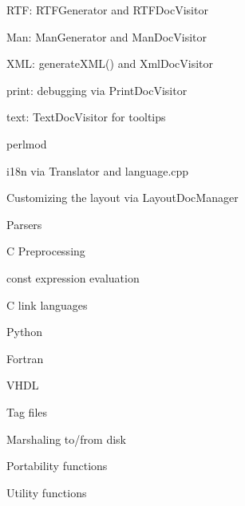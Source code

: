 \begin{DoxyItemize}
\begin{DoxyItemize}
\item R\-T\-F\-: R\-T\-F\-Generator and R\-T\-F\-Doc\-Visitor
\item Man\-: Man\-Generator and Man\-Doc\-Visitor
\item X\-M\-L\-: generate\-X\-M\-L() and Xml\-Doc\-Visitor
\item print\-: debugging via Print\-Doc\-Visitor
\item text\-: Text\-Doc\-Visitor for tooltips
\item perlmod
\end{DoxyItemize}
\item i18n via Translator and language.\-cpp
\item Customizing the layout via Layout\-Doc\-Manager
\item Parsers
\begin{DoxyItemize}
\item C Preprocessing
\begin{DoxyItemize}
\item const expression evaluation
\end{DoxyItemize}
\item C link languages
\item Python
\item Fortran
\item V\-H\-D\-L
\item Tag files
\end{DoxyItemize}
\item Marshaling to/from disk
\item Portability functions
\item Utility functions 
\end{DoxyItemize}